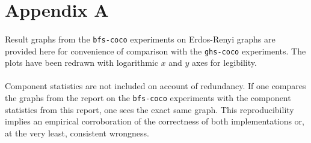\documentclass[11pt,epsf]{article}
\begin{document}
\printbibliography

\section{Appendix A}{
  \paragraph{}{
    Result graphs from the \texttt{bfs-coco} experiments on Erdos-Renyi graphs are provided
    here for convenience of comparison with the \texttt{ghs-coco} experiments. The plots
    have been redrawn with logarithmic $x$ and $y$ axes for legibility.
  }
  \paragraph{}{
    Component statistics are not included on account of redundancy. If one compares the graphs from
    the report on the \texttt{bfs-coco} experiments with the component statistics from this report\autocite[18]{bfs-coco},
    one sees the exact same graph. This reproducibility implies an empirical corroboration of the
    correctness of both implementations or, at the very least, consistent wrongness.
  }

}
\end{document}
